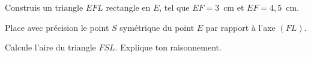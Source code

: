 Construis un triangle $EFL$ rectangle en $E$, tel que $EF=3$~cm et
$EF=4,5$~cm.\par Place avec précision le point $S$ symétrique du
point $E$ par rapport à l'axe $(FL)$.
\par Calcule l'aire du triangle $FSL$. Explique ton raisonnement.